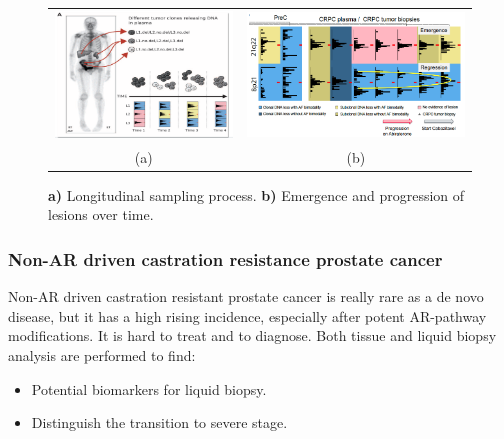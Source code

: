         \begin{figure}[H]
            \begin{tabular}{cc}
                \includegraphics[width=0.4\linewidth]{case1a} &\includegraphics[width=0.6\linewidth]{case1b} \\
                (a)  & (b)  \\
            \end{tabular}
            \caption{\textbf{a)} Longitudinal sampling process. \textbf{b)} Emergence and progression of lesions over time.}
            \label{fig:case1}
        \end{figure}

        \subsubsection{Non-AR driven castration resistance prostate cancer}
        Non-AR driven castration resistant prostate cancer is really rare as a de novo disease, but it has a high rising incidence, especially after potent AR-pathway modifications.
        It is hard to treat and to diagnose.
        Both tissue and liquid biopsy analysis are performed to find:

        \begin{multicols}{2}
            \begin{itemize}
                \item Potential biomarkers for liquid biopsy.
                \item Distinguish the transition to severe stage.
            \end{itemize}
        \end{multicols}

